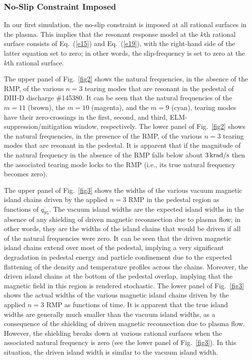 \documentclass[12pt,prb,aps]{revtex4-1}
\begin{document}
\subsubsection{No-Slip Constraint Imposed}
In our first simulation, the no-slip constraint is imposed at all rational surfaces in the plasma. This implies that the resonant response
model at the $k$th rational surface consists of Eq.~(\ref{e15}) and Eq.~(\ref{e19}), with the right-hand side of the latter equation
set to zero; in other words,  the slip-frequency is set to zero at the $k$th rational surface.

The upper panel of Fig.~\ref{fig2} shows the natural frequencies, in the absence of the RMP, of the various  $n=3$ tearing modes 
 that are resonant in the pedestal of DIII-D discharge \#145380. It can be seen that 
the natural frequencies of the $m=11$ (brown), the $m=10$ (magenta), and the $m=9$ (cyan), tearing modes have their
zero-crossings in the  first, second, and third, ELM-suppression/mitigation window, respectively. 
  The lower panel of Fig.~\ref{fig2} shows the natural frequencies, in the presence of the RMP, of the various $n=3$
tearing modes that are resonant in the pedestal. It is apparent that if the magnitude of the natural frequency in the absence of the RMP falls below about
$3\,{\rm krad/s}$ then the associated tearing mode locks to the RMP (i.e., its true natural frequency becomes zero). 

The upper panel of Fig.~\ref{fig3} shows the widths of the various vacuum magnetic island chains driven by the applied $n=3$ RMP in the pedestal region as functions of $
\overline{q_{95}}$.
The vacuum island widths are the  expected island widths in the absence of any shielding of driven magnetic reconnection due to
plasma flow; in other words, they are the  widths of the island chains that would be driven if all of the natural frequencies were zero. It can be seen that
the driven magnetic island chains extend over most of the pedestal, implying a very significant degradation in pedestal energy and particle confinement due to the
expected flattening of the density and temperature profiles across the chains.\cite{flat} Moreover, the driven island chains at the
bottom of the pedestal overlap, implying that the magnetic field in this region is rendered stochastic. The lower panel
of Fig.~\ref{fig3} shows the actual widths of the various magnetic island chains driven by the applied $n=3$ RMP as functions of time. It is apparent 
that the true island widths are generally much smaller than the vacuum island widths, as a consequence of the shielding of driven magnetic
reconnection due to plasma flow. However, the shielding breaks down at various rational surfaces when the associated natural frequency is zero (see the lower panel of
Fig.~\ref{fig3}). In this situation, the driven island width is similar to the vacuum island width.
\end{document}
